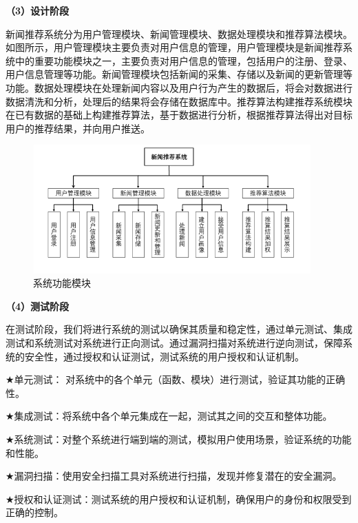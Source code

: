\documentclass[withoutpreface,bwprint]{cumcmthesis} %
\begin{document}
	\textbf{（3）设计阶段}\par
	新闻推荐系统分为用户管理模块、新闻管理模块、数据处理模块和推荐算法模块。如图所示，用户管理模块主要负责对用户信息的管理，用户管理模块是新闻推荐系统中的重要功能模块之一，主要负责对用户信息的管理，包括用户的注册、登录、用户信息管理等功能。新闻管理模块包括新闻的采集、存储以及新闻的更新管理等功能。数据处理模块在处理新闻内容以及用户行为产生的数据后，将会对数据进行数据清洗和分析，处理后的结果将会存储在数据库中。推荐算法构建推荐系统模块在已有数据的基础上构建推荐算法，基于数据进行分析，根据推荐算法得出对目标用户的推荐结果，并向用户推送。\par
	\begin{figure}[H]
		\centering
		\includegraphics[width=0.95\textwidth]{系统功能模块图}
		\caption{系统功能模块}
		\label{fig:circuit-diagcam}
	\end{figure}
	\textbf{（4）测试阶段}\par
	在测试阶段，我们将进行系统的测试以确保其质量和稳定性，通过单元测试、集成测试和系统测试对系统进行正向测试。通过漏洞扫描对系统进行逆向测试，保障系统的安全性，通过授权和认证测试，测试系统的用户授权和认证机制。\par
	$\bigstar$单元测试： 对系统中的各个单元（函数、模块）进行测试，验证其功能的正确性。\par
	$\bigstar$集成测试：将系统中各个单元集成在一起，测试其之间的交互和整体功能。\par
	$\bigstar$系统测试：对整个系统进行端到端的测试，模拟用户使用场景，验证系统的功能和性能。\par
	$\bigstar$漏洞扫描：使用安全扫描工具对系统进行扫描，发现并修复潜在的安全漏洞。\par
	$\bigstar$授权和认证测试：测试系统的用户授权和认证机制，确保用户的身份和权限受到正确的控制。
\end{document}
